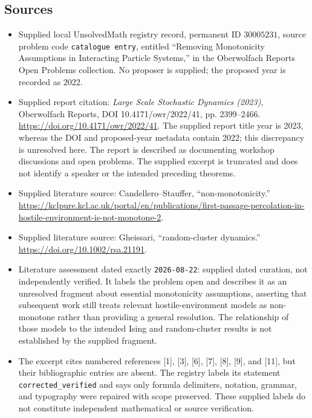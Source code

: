 \documentclass[11pt]{article}
\begin{document}
\subsection{Sources}
\begin{itemize}
\item Supplied local UnsolvedMath registry record, permanent ID \(30005231\), source problem code \texttt{catalogue entry}, entitled ``Removing Monotonicity Assumptions in Interacting Particle Systems,'' in the Oberwolfach Reports Open Problems collection. No proposer is supplied; the proposed year is recorded as 2022.
\item Supplied report citation: \emph{Large Scale Stochastic Dynamics (2023)}, Oberwolfach Reports, DOI 10.4171/owr/2022/41, pp. 2399--2466. \url{https://doi.org/10.4171/owr/2022/41}. The supplied report title year is 2023, whereas the DOI and proposed-year metadata contain 2022; this discrepancy is unresolved here. The report is described as documenting workshop discussions and open problems. The supplied excerpt is truncated and does not identify a speaker or the intended preceding theorems.
\item Supplied literature source: Candellero--Stauffer, ``non-monotonicity.'' \url{https://kclpure.kcl.ac.uk/portal/en/publications/first-passage-percolation-in-hostile-environment-is-not-monotone-2}.
\item Supplied literature source: Gheissari, ``random-cluster dynamics.'' \url{https://doi.org/10.1002/rsa.21191}.
\item Literature assessment dated exactly \texttt{2026-08-22}: supplied dated curation, not independently verified. It labels the problem open and describes it as an unresolved fragment about essential monotonicity assumptions, asserting that subsequent work still treats relevant hostile-environment models as non-monotone rather than providing a general resolution. The relationship of those models to the intended Ising and random-cluster results is not established by the supplied fragment.
\item The excerpt cites numbered references [1], [3], [6], [7], [8], [9], and [11], but their bibliographic entries are absent. The registry labels its statement \texttt{corrected\_verified} and says only formula delimiters, notation, grammar, and typography were repaired with scope preserved. These supplied labels do not constitute independent mathematical or source verification.
\end{itemize}
\end{document}
